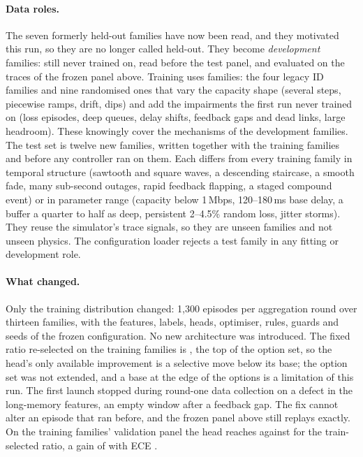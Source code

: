 \documentclass[10pt]{article}
\begin{document}
\paragraph{Data roles.}
The seven formerly held-out families have now been read, and they motivated this run, so they are no longer called held-out. They become \emph{development} families: still never trained on, read before the test panel, and evaluated on the traces of the frozen panel above. Training uses \TypedBroadTrainFamilies{} families: the four legacy ID families and nine randomised ones that vary the capacity shape (several steps, piecewise ramps, drift, dips) and add the impairments the first run never trained on (loss episodes, deep queues, delay shifts, feedback gaps and dead links, large headroom). These knowingly cover the mechanisms of the development families. The test set is twelve new families, written together with the training families and before any controller ran on them. Each differs from every training family in temporal structure (sawtooth and square waves, a descending staircase, a smooth fade, many sub-second outages, rapid feedback flapping, a staged compound event) or in parameter range (capacity below 1\,Mbps, 120--180\,ms base delay, a buffer a quarter to half as deep, persistent 2--4.5\% random loss, jitter storms). They reuse the simulator's trace signals, so they are unseen families and not unseen physics. The configuration loader rejects a test family in any fitting or development role.

\paragraph{What changed.}
Only the training distribution changed: 1{,}300 episodes per aggregation round over thirteen families, with the features, labels, heads, optimiser, rules, guards and seeds of the frozen configuration. No new architecture was introduced. The fixed ratio re-selected on the training families is \TypedBroadBaseRatio{}, the top of the option set, so the head's only available improvement is a selective move below its base; the option set was not extended, and a base at the edge of the options is a limitation of this run. The first launch stopped during round-one data collection on a defect in the long-memory features, an empty window after a feedback gap. The fix cannot alter an episode that ran before, and the frozen panel above still replays exactly. On the training families' validation panel the head reaches \TypedBroadValBayesUtility{} against \TypedBroadValBaseUtility{} for the train-selected ratio, a gain of \TypedBroadValBayesVsBase{} \TypedBroadValBayesVsBaseInterval{} with ECE \TypedBroadValBayesEce{}.
\end{document}
